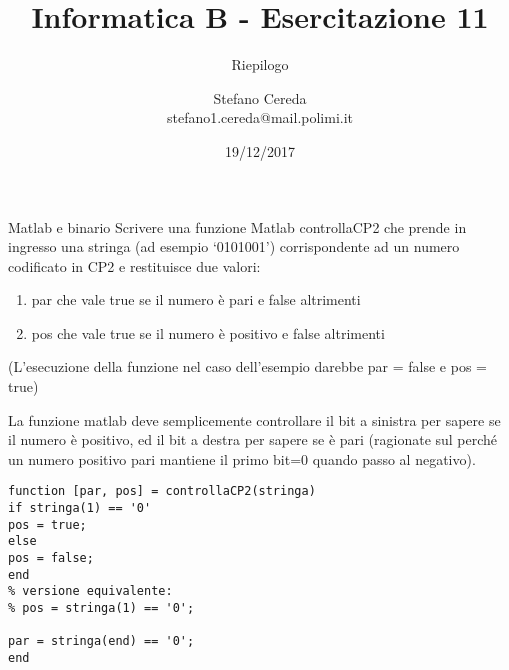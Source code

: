 \documentclass[handout]{beamer}
\title{Informatica B - Esercitazione 11}
\subtitle{Riepilogo}
\author{Stefano Cereda\\
		stefano1.cereda@mail.polimi.it
	}
\date{19/12/2017}
\institute[PoliMi]{\vspace{0.5cm}\centering Politecnico di Milano \\ \vspace{0.2cm}
	\texttt{[image: ./logopolimi]}}
\begin{document}
\begin{frame}
	\maketitle
\end{frame}

\begin{frame}{Matlab e binario}
\framebreak
Scrivere  una  funzione  Matlab  controllaCP2  che  prende  in  ingresso  una  stringa  (ad  
esempio ‘0101001’)  corrispondente  ad  un  numero  codificato  in  CP2  e  restituisce  due  
valori: 
\begin{enumerate}
	\item par  che  vale  true  se  il  numero  è  pari  e  false  altrimenti  
	\item    pos  che  vale  true  se  il  numero  è  positivo  e  false  altrimenti  
\end{enumerate}
(L’esecuzione  della  funzione  nel  caso  dell’esempio  darebbe  par = false  e  pos =
true)


\framebreak

La funzione matlab deve semplicemente controllare il bit a sinistra per sapere se il numero è positivo, ed il bit a destra per sapere se è pari (ragionate sul perché un numero positivo pari mantiene il primo bit=0 quando passo al negativo).
\begin{lstlisting}
function [par, pos] = controllaCP2(stringa)
if stringa(1) == '0'
pos = true;
else
pos = false;
end
% versione equivalente:
% pos = stringa(1) == '0';

par = stringa(end) == '0';
end
\end{lstlisting}


\end{frame}
\end{document}
